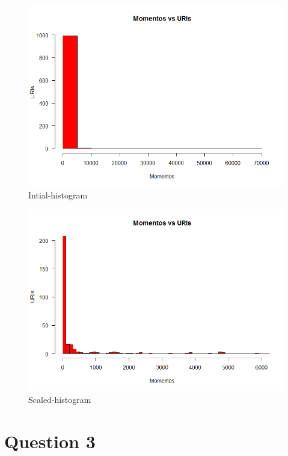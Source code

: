 \documentclass[12pt]{article}
\begin{document}
\begin{figure}[ht]
\includegraphics[scale=0.7]{../Q2/histogramMomentoURI_1}
\centering
\caption{Intial-histogram}
\label{fig:initial-histogram}
\end{figure}
\newpage
\begin{figure}[ht]
\includegraphics[scale=0.7]{../Q2/histogramMomentoURI_2}
\centering
\caption{Scaled-histogram}
\label{fig:scaled-histogram}
\end{figure}
\newpage
\section{Question 3}
\end{document}
